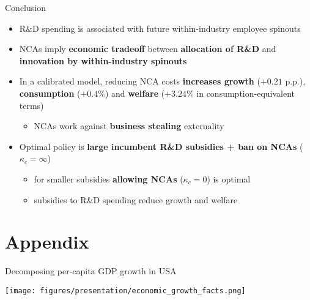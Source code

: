\documentclass[english,usenames,dvipsnames]{beamer}
\begin{document}
\begin{frame}{Conclusion}
	\begin{itemize}
		\item R\&D spending is associated with future within-industry employee spinouts
		\medskip
		\item NCAs imply \alert{\textbf{economic tradeoff}} between \alert{\textbf{allocation of R\&D}} and \alert{\textbf{innovation by within-industry spinouts}}
		\medskip
		\item In a calibrated model, reducing NCA costs \alert{\textbf{increases growth }} ($+0.21$ p.p.), \alert{\textbf{consumption}} ($+0.4\%$) and \alert{\textbf{welfare}} ($+3.24\%$ in consumption-equivalent terms)
		\begin{itemize}
			\item NCAs work against \alert{\textbf{business stealing}} externality
		\end{itemize}
		\medskip
		\item Optimal policy is \alert{\textbf{large incumbent R\&D subsidies + ban on NCAs}} ($\kappa_c = \infty$)
		\begin{itemize}
			\item for smaller subsidies \alert{\textbf{allowing NCAs}} ($\kappa_c = 0$) is optimal
			\item subsidies to R\&D spending reduce growth and welfare
		\end{itemize}
	\end{itemize}
\end{frame}

\appendix

\section{Appendix}

\begin{frame}{Decomposing per-capita GDP growth in USA}\label{economic_growth_facts}\hyperlink{motivation_background}{}
	\begin{table}
		\texttt{[image: figures/presentation/economic\_growth\_facts.png]}
		\caption{Growth accounting (from Jones 2016, "The Facts of Economic Growth")}
	\end{table}
\end{frame}
\end{document}

